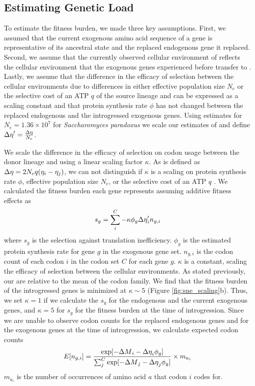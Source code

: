 \subsection*{Estimating Genetic Load}

To estimate the fitness burden, we made three key assumptions.
First, we assumed that the current exogenous amino acid sequence of a gene is representative of its ancestral state and the replaced endogenous gene it replaced.
Second, we assume that the currently observed cellular environment of \gossypii reflects the cellular environment that the exogenous genes experienced before transfer to \kluyveri.
Lastly, we assume that the difference in the efficacy of selection between the cellular environments due to differences in either effective population size $N_e$ or the selective cost of an ATP $q$ of the source lineage and \kluyveri can be expressed as a scaling constant and that protein synthesis rate $\phi$ has not changed between the replaced endogenous and the introgressed exogenous genes.
Using estimates for $N_e = 1.36\times10^7$ \citep{wagner2005} for \textit{Saccharomyces paradoxus} we scale our estimates of \DE and define ${\Delta \eta}' = \frac{{\Delta \eta}}{N_e}$.

We scale the difference in the efficacy of selection on codon usage between the donor lineage and \kluyveri using a linear scaling factor $\kappa$.
As \DE is defined as ${\Delta \eta} = 2N_eq(\eta_i-\eta_j)$, we can not distinguish if $\kappa$ is a scaling on protein synthesis rate $\phi$, effective population size $N_e$, or the selective cost of an ATP $q$ \citep{gilchrist2007, gilchrist2015}.
We calculated the fitness burden each gene represents assuming additive fitness effects as 
\begin{equation}
s_g = \sum_i^{C} -\kappa \phi_g {\Delta \eta}'_i n_{g,i} 
\end{equation}
where $s_g$ is the selection against translation inefficiency.
$\phi_g$ is the estimated protein synthesis rate for gene $g$ in the exogenous gene set.
$n_{g,i}$ is the codon count of each codon $i$ in the codon set $C$ for each gene $g$.
$\kappa$ is a constant, scaling the efficacy of selection between the cellular environments.
As stated previously, our \DE are relative to the mean of the codon family.
We find that the fitness burden of the introgressed genes  is minimized at $\kappa \sim 5$ (Figure \ref{fig:sne_scaling}b).
Thus, we set $\kappa = 1$ if we calculate the $s_g$ for the endogenous and the current exogenous genes, and $\kappa = 5$ for $s_g$ for the fitness burden at the time of introgression.
Since we are unable to observe codon counts for the replaced endogenous genes and for the exogenous genes at the time of introgression, we calculate expected codon counts
\begin{equation}
E[n_{g,i}] = \frac{\exp[-{\Delta M}_i -{\Delta \eta}_i\phi_g]}{\sum_j^C \exp[-{\Delta M}_j -{\Delta \eta}_j\phi_g]}\times m_{a_i}
\end{equation} 
$m_{a_i}$ is the number of occurrences of amino acid $a$ that codon $i$ codes for.

